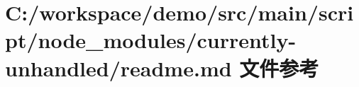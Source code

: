 \hypertarget{node__modules_2currently-unhandled_2_r_e_a_d_m_e_8md}{}\section{C\+:/workspace/demo/src/main/script/node\+\_\+modules/currently-\/unhandled/readme.md 文件参考}
\label{node__modules_2currently-unhandled_2_r_e_a_d_m_e_8md}
